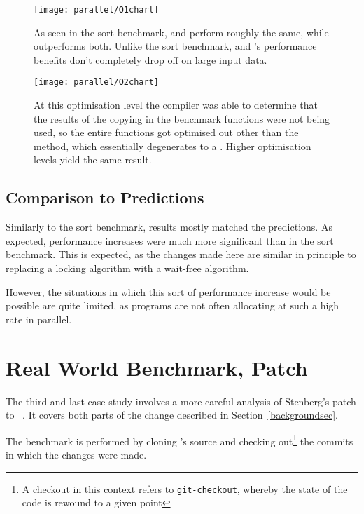 \begin{figure}[p]
	\centering
	\texttt{[image: parallel/O1chart]}
	\caption{As seen in the sort benchmark,  and  perform roughly the same, while  outperforms both. Unlike the sort benchmark,  and 's performance benefits don't completely drop off on large input data.}
\end{figure}

\begin{figure}[p]
	\centering
	\texttt{[image: parallel/O2chart]}
	\caption{At this optimisation level the compiler was able to determine that the results of the copying in the benchmark functions were not being used, so the entire functions got optimised out other than the  method, which essentially degenerates to a . Higher optimisation levels yield the same result.}\label{lastparallel}
\end{figure}

\subsection{Comparison to Predictions}

Similarly to the sort benchmark, results mostly matched the predictions. As expected, performance increases were much more significant than in the sort benchmark. This is expected, as the changes made here are similar in principle to replacing a locking algorithm with a wait-free algorithm.

However, the situations in which this sort of performance increase would be possible are quite limited, as programs are not often allocating at such a high rate in parallel.

\pagebreak

\section{Real World Benchmark,  Patch}

The third and last case study involves a more careful analysis of Stenberg's patch to ~\cite{curlmalloc}. It covers both parts of the change described in Section~\ref{backgroundsec}.

The benchmark is performed by cloning 's source and checking out\footnote{A checkout in this context refers to \texttt{git-checkout}, whereby the state of the code is rewound to a given point} the commits in which the changes were made.

